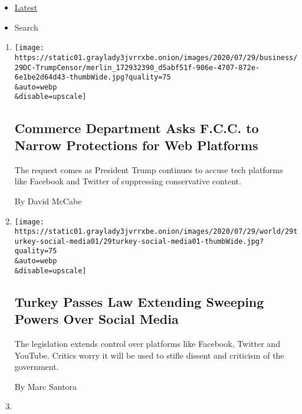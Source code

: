 \begin{itemize}
\tightlist
\item
  \protect\hyperlink{stream-panel}{Latest}
\item
  Search
\end{itemize}

\begin{enumerate}
\def\labelenumi{\arabic{enumi}.}
\item
  \href{/2020/07/29/technology/trump-fcc-twitter-facebook.html}{}

  \texttt{[image: https://static01.graylady3jvrrxbe.onion/images/2020/07/29/business/29DC-TrumpCensor/merlin\_172932390\_d5abf51f-906e-4707-872e-6e1be2d64d43-thumbWide.jpg?quality=75\\\&auto=webp\\\&disable=upscale]}

  \hypertarget{commerce-department-asks-fcc-to-narrow-protections-for-web-platforms}{%
  \subsection{Commerce Department Asks F.C.C. to Narrow Protections for
  Web
  Platforms}\label{commerce-department-asks-fcc-to-narrow-protections-for-web-platforms}}

  The request comes as President Trump continues to accuse tech
  platforms like Facebook and Twitter of suppressing conservative
  content.

  By David McCabe
\item
  \href{/2020/07/29/world/europe/turkey-social-media-control.html}{}

  \texttt{[image: https://static01.graylady3jvrrxbe.onion/images/2020/07/29/world/29turkey-social-media01/29turkey-social-media01-thumbWide.jpg?quality=75\\\&auto=webp\\\&disable=upscale]}

  \hypertarget{turkey-passes-law-extending-sweeping-powers-over-social-media}{%
  \subsection{Turkey Passes Law Extending Sweeping Powers Over Social
  Media}\label{turkey-passes-law-extending-sweeping-powers-over-social-media}}

  The legislation extends control over platforms like Facebook, Twitter
  and YouTube. Critics worry it will be used to stifle dissent and
  criticism of the government.

  By Marc Santora
\item
  \href{/2020/07/28/business/media/universal-amc-movies-at-home.html}{}


\end{enumerate}
